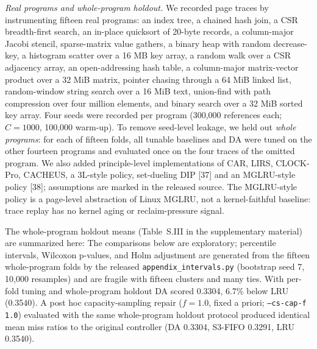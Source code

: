 \documentclass[10pt,twocolumn,a4paper]{IEEEtran}
\begin{document}
\emph{Real programs and whole-program holdout.} We recorded page traces by
instrumenting fifteen real programs: an index tree, a chained hash join, a CSR
breadth-first search, an in-place quicksort of 20-byte records, a column-major
Jacobi stencil, sparse-matrix value gathers, a binary heap with random
decrease-key, a histogram scatter over a 16 MB key array, a random walk over a
CSR adjacency array, an open-addressing hash table, a column-major
matrix-vector product over a 32 MiB matrix, pointer chasing through a 64 MiB
linked list, random-window string search over a 16 MiB text, union-find with
path compression over four million elements, and binary search over a 32 MiB
sorted key array. Four seeds were recorded per program (300,000 references
each; $C = 1000$, 100,000 warm-up). To remove seed-level leakage, we held out
\emph{whole programs}: for each of fifteen folds,
all tunable baselines and DA were tuned on the other fourteen programs and
evaluated once on the four traces of the omitted program. We also added
principle-level implementations of CAR, LIRS, CLOCK-Pro, CACHEUS, a 3L-style
policy, set-dueling DIP [37] and an MGLRU-style policy [38]; assumptions are
marked in the released source. The MGLRU-style policy is a page-level
abstraction of Linux MGLRU, not a kernel-faithful baseline: trace replay has no
kernel aging or reclaim-pressure signal.



The whole-program holdout means (Table~S.III in the supplementary material) are summarized here: The comparisons
below are exploratory; percentile intervals, Wilcoxon p-values, and Holm
adjustment are generated from the fifteen whole-program folds by the released
\texttt{appendix\_intervals.py} (bootstrap seed 7, 10,000 resamples) and are
fragile with fifteen clusters and many ties. With per-fold tuning and
whole-program holdout DA scored 0.3304, 6.7\% below LRU (0.3540). A post hoc
capacity-sampling repair ($f{=}1.0$, fixed a priori; \texttt{--cs-cap-f 1.0})
evaluated with the same whole-program holdout protocol produced identical mean
miss ratios to the original controller (DA 0.3304, S3-FIFO 0.3291, LRU 0.3540).
\end{document}
